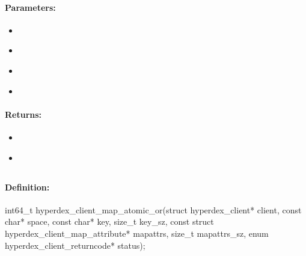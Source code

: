 \paragraph{Parameters:}
\begin{itemize}[noitemsep]
\item {}\\

\item {}\\

\item {}\\

\item {}\\

\end{itemize}

\paragraph{Returns:}
\begin{itemize}[noitemsep]
\item {}\\

\item {}\\

\end{itemize}

\pagebreak
\subsection{}
\label{api:c:map_atomic_or}


\paragraph{Definition:}
\begin{ccode}
int64_t hyperdex_client_map_atomic_or(struct hyperdex_client* client,
        const char* space,
        const char* key, size_t key_sz,
        const struct hyperdex_client_map_attribute* mapattrs, size_t mapattrs_sz,
        enum hyperdex_client_returncode* status);
\end{ccode}

